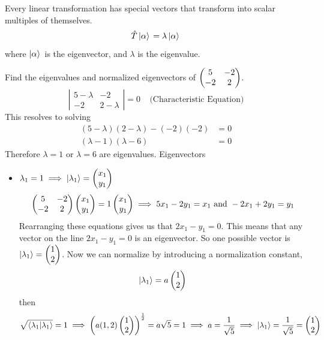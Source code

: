 \documentclass[english, 11pt]{article}
\begin{document}
        \begin{defn}\label{eigenvalues, eigenvectors}
        Every linear transformation has special vectors that transform into scalar multiples of themselves.
        \[ \hat{T}\left| \alpha \rangle \right. = \lambda \left| \alpha \rangle \right. \]
        where $\left| \alpha \rangle \right.$ is the eigenvector, and $\lambda$ is the eigenvalue.
        \end{defn}

        \begin{exmp}
          Find the eigenvalues and normalized eigenvectors of $\left(\begin{matrix}5 & -2 \\ -2 & 2\end{matrix}\right)$.
          \newline
          \[ \left| \begin{matrix} 5 - \lambda & -2 \\ -2 & 2-\lambda \end{matrix} \right| = 0 \ \ \ \ \ \mbox{(Characteristic Equation)} \]
          This resolves to solving
          \begin{align*}
            (5-\lambda)(2-\lambda) - (-2)(-2) & = 0 \\
            (\lambda - 1)(\lambda - 6) & = 0
          \end{align*}
          Therefore $\lambda = 1$ or $\lambda = 6$ are eigenvalues. Eigenvectors
          \begin{itemize}
            \item $\lambda_1 = 1 \implies \left|\lambda_1\right\rangle = \left(\begin{matrix}x_1 \\ y_1\end{matrix}\right)$
            \[ \left(\begin{matrix}5 & -2 \\ -2 & 2\end{matrix}\right)\left(\begin{matrix}x_1 \\ y_1\end{matrix}\right) = 1 \left(\begin{matrix}x_1 \\ y_1\end{matrix}\right) \implies 5x_1 - 2y_1 = x_1 \mbox{ and } -2x_1 + 2y_1 = y_1 \]
            Rearranging these equations gives us that $2x_1 - y_1 = 0$. This means that any vector on the line $2x_1 - y_1 = 0$ is an eigenvector. So one possible vector is $\left|\lambda_1\right\rangle = \left(\begin{matrix}1 \\ 2\end{matrix}\right)$. Now we can normalize by introducing a normalization constant,
            \[ \left|\lambda_1\right\rangle = a \left(\begin{matrix}1 \\ 2\end{matrix}\right) \]
            then
            \[ \sqrt{\braket{\lambda_1}{\lambda_1}} = 1 \implies \left(a(1,2)\mtx{1 \\ 2} \right)^{\f{1}{2}} = a\sqrt{5} = 1 \implies a = \f{1}{\sqrt{5}} \implies \ket{\lambda_1} = \f{1}{\sqrt{5}} = \mtx{1 \\ 2} \]
          \end{itemize}
        \end{exmp}
\end{document}
